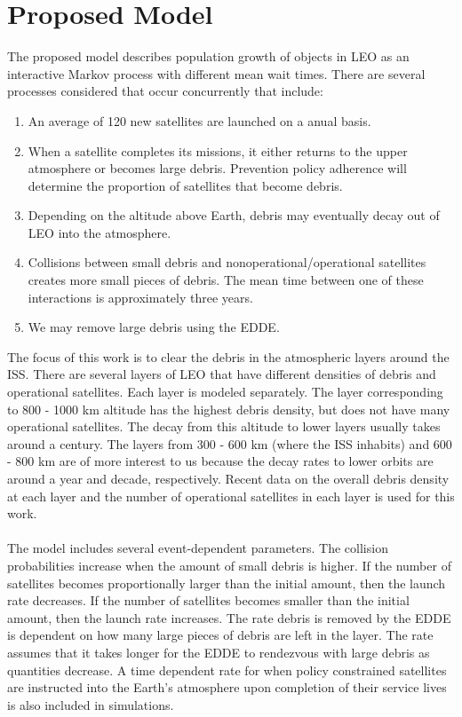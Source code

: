 \documentclass{article}
\theoremstyle{plain}			%
\theoremstyle{definition}		%
\theoremstyle{remark}
\numberwithin{equation}{section}
\numberwithin{figure}{section}
\numberwithin{table}{section}
\begin{document}
\section{Proposed Model}
The proposed model describes population growth of objects in LEO as an interactive Markov process with different mean wait times. There are several processes considered that occur concurrently that include:
\begin{enumerate}
\item An average of 120 new satellites are launched on a anual basis.
\item  When a satellite completes its missions, it either returns to the upper atmosphere or becomes large debris. Prevention policy adherence will determine the proportion of satellites that become debris.
\item Depending on the altitude above Earth, debris may eventually decay out of LEO into the atmosphere.
\item Collisions between small debris and nonoperational/operational satellites creates more small pieces of debris. The mean time between
one of these interactions is approximately three years.
\item We may remove large debris using the EDDE.
\end{enumerate}
\vspace{0.3cm}
The focus of this work is to clear the debris in the atmospheric layers around the ISS. There are several layers of LEO that have different densities of
debris and operational satellites. Each layer is modeled separately. The layer corresponding to 800 - 1000 km altitude has the highest debris density, but does not have many operational satellites. The decay from this altitude to lower layers usually takes around a century. The layers from 300 - 600 km (where the ISS inhabits) and 600 - 800 km are of more interest to us because the decay rates to lower orbits are around a year and decade, respectively. Recent data on the overall debris density at each layer and the number of operational satellites in each layer is used for this work. \\
\\
The model includes several event-dependent parameters. The collision probabilities increase when the amount of small debris is higher. If the number of satellites becomes proportionally larger than the initial amount, then the launch rate decreases. If the number of satellites becomes smaller than the initial amount, then the launch rate increases. The rate debris is removed by the EDDE is dependent on how many large pieces of debris are left in the layer. The rate assumes that it takes longer for the EDDE to rendezvous with large debris as quantities decrease. A time dependent rate for when policy constrained satellites are instructed into the Earth's atmosphere upon completion of their service lives is also included in simulations. \\
\end{document}
